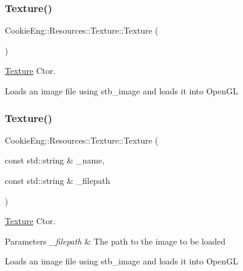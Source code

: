 \subsubsection{\texorpdfstring{Texture()}{Texture()}\hspace{0.1cm}{\footnotesize\ttfamily [1/2]}}
{\footnotesize\ttfamily Cookie\+Eng\+::\+Resources\+::\+Texture\+::\+Texture (\begin{DoxyParamCaption}{ }\end{DoxyParamCaption})}



\hyperlink{class_cookie_eng_1_1_resources_1_1_texture}{Texture} Ctor. 

Loads an image file using stb\+\_\+image and loads it into Open\+GL \mbox{\label{class_cookie_eng_1_1_resources_1_1_texture_a8bcbd117b436060b0540c3c80dc88b54}} 
\subsubsection{\texorpdfstring{Texture()}{Texture()}\hspace{0.1cm}{\footnotesize\ttfamily [2/2]}}
{\footnotesize\ttfamily Cookie\+Eng\+::\+Resources\+::\+Texture\+::\+Texture (\begin{DoxyParamCaption}\item[{const std\+::string \&}]{\+\_\+name,  }\item[{const std\+::string \&}]{\+\_\+filepath }\end{DoxyParamCaption})}



\hyperlink{class_cookie_eng_1_1_resources_1_1_texture}{Texture} Ctor. 


\begin{DoxyParams}{Parameters}
{\em \+\_\+filepath} & The path to the image to be loaded\\
\hline
\end{DoxyParams}
Loads an image file using stb\+\_\+image and loads it into Open\+GL \mbox{\label{class_cookie_eng_1_1_resources_1_1_texture_ac5830da00fa12695714d1ed03d03a591}} 
